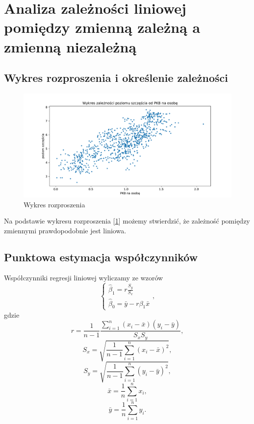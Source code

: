 \documentclass{article}
\theoremstyle{break}
\begin{document}
\section{Analiza zależności liniowej pomiędzy zmienną zależną a zmienną niezależną}

\subsection{Wykres rozproszenia i określenie zależności}

\begin{figure}[H]
	\begin{center}
		\includegraphics[scale=0.43]{plot1.pdf}
		\caption{Wykres rozproszenia}
		\label{fig:rozproszenie}
	\end{center}
\end{figure}

Na podstawie wykresu rozproszenia [\ref{fig:rozproszenie}] możemy stwierdzić, że zależność pomiędzy zmiennymi prawdopodobnie jest liniowa.

\subsection{Punktowa estymacja współczynników}

Współczynniki regresji liniowej wyliczamy ze wzorów
\begin{equation}
\left\{ \begin{array}{ll}
	\hat{\beta}_{1} = r\frac{S_{y}}{S_{x}}\\
	\hat{\beta}_{0} = \bar{y} - r\beta_{1}\bar{x}
\end{array} \right.,
\label{eq:wspol_reg}
\end{equation} gdzie
\begin{equation}
	r = \frac{1}{n-1}\frac{\sum_{i=1}^{n}(x_i-\bar{x})(y_i-\bar{y})}{S_{x}S_{y}},
\end{equation}
\begin{equation}
	S_{x} = \sqrt{\frac{1}{n-1}\sum_{i=1}^{n}(x_{i}-\bar{x})^{2}},
\end{equation}
\begin{equation}
	S_{y} = \sqrt{\frac{1}{n-1}\sum_{i=1}^{n}(y_{i}-\bar{y})^{2}},
\end{equation}
\begin{equation}
	\bar{x} = \frac{1}{n}\sum_{i=1}^{n}x_{i},
\end{equation}
\begin{equation}
	\bar{y} = \frac{1}{n}\sum_{i=1}^{n}y_{i}.
\end{equation}
\end{document}
